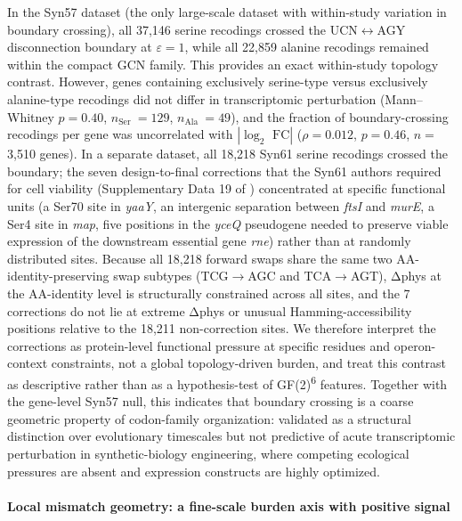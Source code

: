 \documentclass[preprint,11pt,authoryear,a4paper]{elsarticle}
\begin{document}
In the \citep{robertson2025syn57} Syn57 dataset (the only large-scale
dataset with within-study variation in boundary crossing), all 37,146
serine recodings crossed the UCN\(\leftrightarrow\)AGY disconnection
boundary at \(\varepsilon = 1\), while all 22,859 alanine recodings
remained within the compact GCN family. This provides an exact
within-study topology contrast. However, genes containing exclusively
serine-type versus exclusively alanine-type recodings did not differ in
transcriptomic perturbation (Mann--Whitney \(p = 0.40\),
\(n_{\text{Ser }} = 129\), \(n_{\text{Ala }} = 49\)), and the fraction
of boundary-crossing recodings per gene was uncorrelated with
\(|\log_{2}\text{ FC}|\) (\(\rho = 0.012\), \(p = 0.46\), \(n =\)3,510
genes). In a separate dataset, all 18,218 Syn61 serine recodings
\citep{fredens2019} crossed the boundary; the seven design-to-final
corrections that the Syn61 authors required for cell viability
(Supplementary Data 19 of \citep{fredens2019}) concentrated at specific
functional units (a Ser70 site in \emph{yaaY}, an intergenic separation
between \emph{ftsI} and \emph{murE}, a Ser4 site in \emph{map}, five
positions in the \emph{yceQ} pseudogene needed to preserve viable
expression of the downstream essential gene \emph{rne}) rather than at
randomly distributed sites. Because all 18,218 forward swaps share the
same two AA-identity-preserving swap subtypes (TCG\(\rightarrow\)AGC and
TCA\(\rightarrow\)AGT), \textbar Δphys\textbar{} at the AA-identity
level is structurally constrained across all sites, and the 7
corrections do not lie at extreme \textbar Δphys\textbar{} or unusual
Hamming-accessibility positions relative to the 18,211 non-correction
sites. We therefore interpret the corrections as protein-level
functional pressure at specific residues and operon-context constraints,
not a global topology-driven burden, and treat this contrast as
descriptive rather than as a hypothesis-test of GF(2)\textsuperscript{6}
features. Together with the gene-level Syn57 null, this indicates that
boundary crossing is a coarse geometric property of codon-family
organization: validated as a structural distinction over evolutionary
timescales but not predictive of acute transcriptomic perturbation in
synthetic-biology engineering, where competing ecological pressures are
absent and expression constructs are highly optimized.

\paragraph{Local mismatch geometry: a fine-scale burden axis with
positive signal}\label{sec:local-mismatch-geom}
\end{document}
